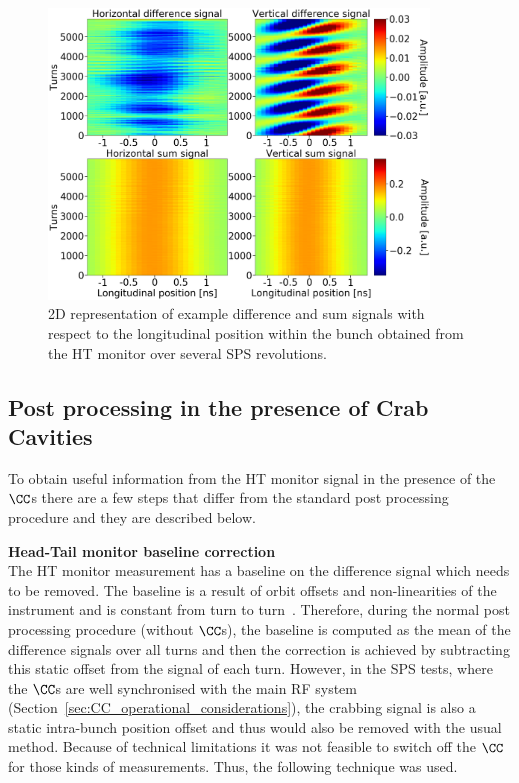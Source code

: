 \begin{figure}[!h]
   \centering         
   \includegraphics[width=0.9\textwidth]{images/Ch4/HT_2D__20180530_135105_colorbar_new_version.png}
       \caption{2D representation of example difference and sum signals with respect to the longitudinal position within the bunch obtained from the HT monitor over several SPS revolutions.}
       \label{fig:HT_example_signals_2D}
\end{figure}

\subsection{Post processing in the presence of Crab Cavities}\label{subsec:HT_post_process_CC}
To obtain useful information from the HT monitor signal in the presence of the $\CC$s there are a few steps that differ from the standard post processing procedure and they are described below.

\normalsize{\textbf{Head-Tail monitor baseline correction}}\\
The HT monitor measurement has a baseline on the difference signal which needs to be removed. The baseline is a result of orbit offsets and non-linearities of the instrument and is constant from turn to turn~\cite{Levens:2313358}. Therefore, during the normal post processing procedure (without $\CC$s), the baseline is computed as the mean of the difference signals over all turns and then the correction is achieved by subtracting this static offset from the signal of each turn. However, in the SPS tests, where the $\CC$s are well synchronised with the main RF system (Section~\ref{sec:CC_operational_considerations}), the crabbing signal is also a static intra-bunch position offset and thus would also be removed with the usual method. Because of technical limitations it was not feasible to switch off the $\CC$ for those kinds of measurements. Thus, the following technique was used. 

